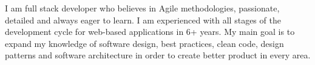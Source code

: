 

\begin{cvparagraph}

I am full stack developer who believes in Agile methodologies, passionate, detailed and always eager to learn. 
I am experienced with all stages of the development cycle for web-based applications in 6+ years.
My main goal is to expand my knowledge of software design, best practices, clean code, design patterns and software architecture in order to create better product in every area.
\end{cvparagraph}

